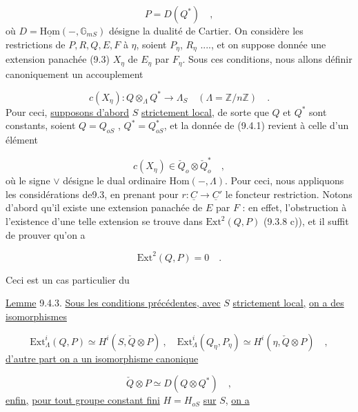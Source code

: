 \begin{equation*}
P = D(Q^*) \quad ,
\end{equation*}
où $D = \underline{\mathrm{Hom}}( -, \mathbb{G}_{mS})$ désigne la dualité de Cartier. On considère les restrictions de $P,R,Q,E,F$ à $\eta$, soient $P_\eta$, $R_\eta$ ...., et on suppose donnée une extension panachée (9.3) $X_\eta$ de $E_\eta$ par $F_\eta$. Sous ces conditions, nous allons définir canoniquement un accouplement

\begin{equation}\tag{9.4.1}
c(X_\eta) : Q \otimes_\Lambda Q^* \longrightarrow \Lambda_S \quad (\Lambda = \mathbb{Z}/n\mathbb{Z}) \quad .
\end{equation}
Pour ceci, \underline{supposons d'abord} $S$ \underline{strictement local}, de sorte que $Q$ et $Q^*$ sont constants, soient $Q = Q_{oS}$ , $Q^* = Q^*_{oS}$, et la donnée de (9.4.1) revient à celle d'un élément

\begin{equation}\tag{9.4.2}
c(X_\eta) \in \check{Q}_o \otimes \check{Q}^*_o \quad ,
\end{equation}
où le signe $\vee$ désigne le dual ordinaire $\mathrm{Hom}( - , \Lambda)$. Pour ceci, nous appliquons les considérations de9.3, en prenant pour $r: \underline{C} \longrightarrow \underline{C}'$ le foncteur restriction. Notons d'abord qu'il existe une extension panachée de $E$ par $F$ : en effet, l'obstruction à l'existence d'une telle extension se trouve dans $\mathrm{Ext}^2(Q,P)$ (9.3.8 c)), et il suffit de prouver qu'on a

\begin{equation*}
\mathrm{Ext}^2(Q,P) = 0 \quad .
\end{equation*}


Ceci est un cas particulier du

\underline{Lemme} 9.4.3.  \underline{Sous les conditions précédentes, avec} $S$ \underline{strictement local,} \underline{on a des isomorphismes}

\begin{equation*}\tag{a)}
\mathrm{Ext}^i_\Lambda(Q,P) \simeq H^i(S,\check{Q}\otimes P) \ , \quad \mathrm{Ext}^i_\Lambda(Q_\eta,P_\eta) \simeq H^i(\eta,\check{Q} \otimes P) \quad ,
\end{equation*}
\underline{d'autre part on a un isomorphisme canonique}

\begin{equation}\tag{b)}
\check{Q}\otimes P \simeq D(Q\otimes Q^*) \quad ,
\end{equation}
\underline{enfin,} \underline{pour tout groupe constant fini} $H = H_{oS}$ \underline{sur} $S$, \underline{on a}


